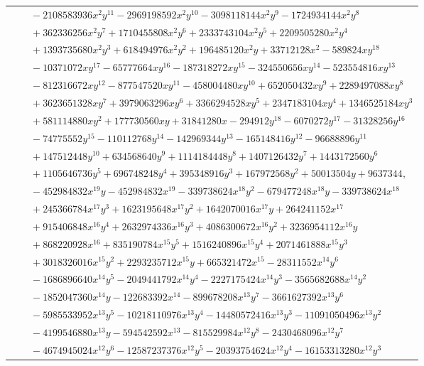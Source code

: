 \documentclass[11pt]{article}
\begin{document}
\begin{longtable}{@{}ll@{}}
 & $\quad -2108583936x^{2}y^{11}-2969198592x^{2}y^{10}-3098118144x^{2}y^{9}-1724934144x^{2}y^{8}$\\
 & $\quad +362336256x^{2}y^{7}+1710455808x^{2}y^{6}+2333743104x^{2}y^{5}+2209505280x^{2}y^{4}$\\
 & $\quad +1393735680x^{2}y^{3}+618494976x^{2}y^{2}+196485120x^{2}y+33712128x^{2}-589824xy^{18}$\\
 & $\quad -10371072xy^{17}-65777664xy^{16}-187318272xy^{15}-324550656xy^{14}-523554816xy^{13}$\\
 & $\quad -812316672xy^{12}-877547520xy^{11}-458004480xy^{10}+652050432xy^{9}+2289497088xy^{8}$\\
 & $\quad +3623651328xy^{7}+3979063296xy^{6}+3366294528xy^{5}+2347183104xy^{4}+1346525184xy^{3}$\\
 & $\quad +581114880xy^{2}+177730560xy+31841280x-294912y^{18}-6070272y^{17}-31328256y^{16}$\\
 & $\quad -74775552y^{15}-110112768y^{14}-142969344y^{13}-165148416y^{12}-96688896y^{11}$\\
 & $\quad +147512448y^{10}+634568640y^{9}+1114184448y^{8}+1407126432y^{7}+1443172560y^{6}$\\
 & $\quad +1105646736y^{5}+696748248y^{4}+395348916y^{3}+167972568y^{2}+50013504y+9637344,$\\
 & $\quad -452984832x^{19}y-452984832x^{19}-339738624x^{18}y^{2}-679477248x^{18}y-339738624x^{18}$\\
 & $\quad +245366784x^{17}y^{3}+1623195648x^{17}y^{2}+1642070016x^{17}y+264241152x^{17}$\\
 & $\quad +915406848x^{16}y^{4}+2632974336x^{16}y^{3}+4086300672x^{16}y^{2}+3236954112x^{16}y$\\
 & $\quad +868220928x^{16}+835190784x^{15}y^{5}+1516240896x^{15}y^{4}+2071461888x^{15}y^{3}$\\
 & $\quad +3018326016x^{15}y^{2}+2293235712x^{15}y+665321472x^{15}-28311552x^{14}y^{6}$\\
 & $\quad -1686896640x^{14}y^{5}-2049441792x^{14}y^{4}-2227175424x^{14}y^{3}-3565682688x^{14}y^{2}$\\
 & $\quad -1852047360x^{14}y-122683392x^{14}-899678208x^{13}y^{7}-3661627392x^{13}y^{6}$\\
 & $\quad -5985533952x^{13}y^{5}-10218110976x^{13}y^{4}-14480572416x^{13}y^{3}-11091050496x^{13}y^{2}$\\
 & $\quad -4199546880x^{13}y-594542592x^{13}-815529984x^{12}y^{8}-2430468096x^{12}y^{7}$\\
 & $\quad -4674945024x^{12}y^{6}-12587237376x^{12}y^{5}-20393754624x^{12}y^{4}-16153313280x^{12}y^{3}$\\

\end{longtable}
\end{document}
